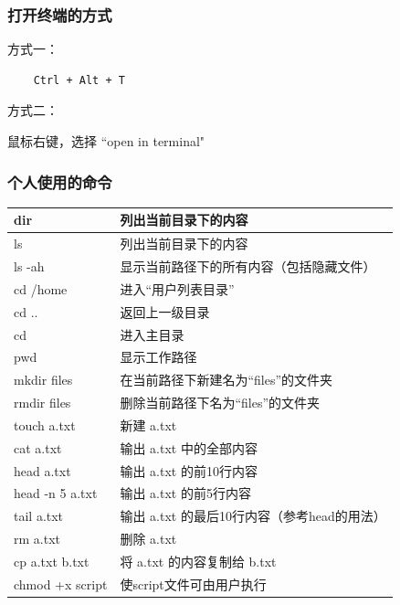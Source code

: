 \documentclass[12pt]{article}
\begin{document}
\subsubsection{打开终端的方式}

方式一：
\begin{verbatim}
    Ctrl + Alt + T
\end{verbatim}

方式二：

鼠标右键，选择  ``open in terminal"

\newpage
\subsubsection{个人使用的命令}

\begin{table}[h]
\centering
\begin{tabular}{|l|l|}
\hline
\rowcolor[HTML]{FFC702} 
{\color[HTML]{000000} dir} & {\color[HTML]{000000} 列出当前目录下的内容} \\ \hline
ls                         & 列出当前目录下的内容                        \\ \hline
\rowcolor[HTML]{FFC702} 
ls -ah                     & 显示当前路径下的所有内容（包括隐藏文件）              \\ \hline
cd /home                   & 进入“用户列表目录”                       \\ \hline
\rowcolor[HTML]{FFC702} 
cd ..                      & 返回上一级目录                           \\ \hline
cd                         & 进入主目录                             \\ \hline
\rowcolor[HTML]{FFC702} 
pwd                        & 显示工作路径                            \\ \hline
mkdir files                & 在当前路径下新建名为“files”的文件夹             \\ \hline
\rowcolor[HTML]{FFC702} 
rmdir files                & 删除当前路径下名为“files”的文件夹              \\ \hline
touch a.txt                & 新建 a.txt                          \\ \hline
\rowcolor[HTML]{FFC702} 
cat a.txt                  & 输出 a.txt 中的全部内容                   \\ \hline
head a.txt                 & 输出 a.txt 的前10行内容                  \\ \hline
\rowcolor[HTML]{FFC702} 
head -n 5 a.txt            & 输出 a.txt 的前5行内容                   \\ \hline
tail a.txt                 & 输出 a.txt 的最后10行内容（参考head的用法）      \\ \hline
\rowcolor[HTML]{FFC702} 
rm a.txt                   & 删除 a.txt                          \\ \hline
cp a.txt b.txt             & 将 a.txt 的内容复制给 b.txt              \\ \hline
\rowcolor[HTML]{FFC702} 
chmod +x script            & 使script文件可由用户执行                   \\ \hline
\end{tabular}
\end{table}
\end{document}
